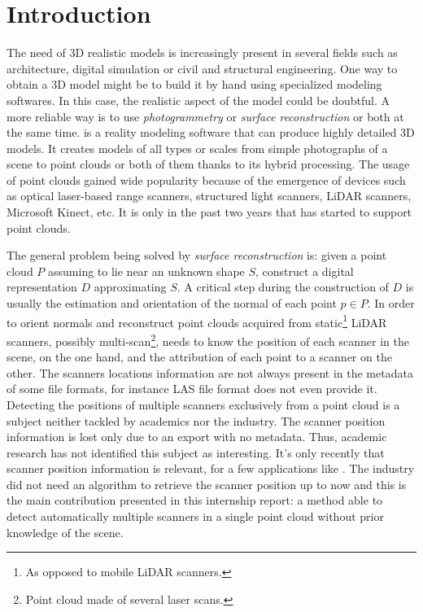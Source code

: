 \chapter{Introduction}
\label{ch:introduction}

The need of 3D realistic models is increasingly present in several fields such as architecture, digital simulation or civil and structural engineering. One way to obtain a 3D model might be to build it by hand using specialized modeling softwares. In this case, the realistic aspect of the model could be doubtful. A more reliable way is to use \emph{photogrammetry} or \emph{surface reconstruction} or both at the same time. \CC is a reality modeling software that can produce highly detailed 3D  models. It creates models of all types or scales from simple photographs of a scene to point clouds or both of them thanks to its hybrid processing. The usage of point clouds gained wide popularity because of the emergence of devices such as optical laser-based range scanners, structured light scanners, LiDAR scanners, Microsoft Kinect, etc. It is only in the past two years that \CC has started to support point clouds.

The general problem being solved by \emph{surface reconstruction} is:  given a point cloud $P$ assuming to lie near an unknown shape $S$,  construct a digital representation $D$ approximating $S$. A critical step during the construction of $D$ is usually the estimation and orientation of the normal of each point $p \in P$. In order to orient normals and  reconstruct point clouds acquired from static\footnote{As opposed to mobile LiDAR scanners.} LiDAR scanners, possibly multi-scan\footnote{Point cloud made of several laser scans.}, \CC needs to know the position of each scanner in the scene, on the one hand, and the attribution of each point to a scanner on the other. The scanners locations information are not always present in the metadata of some file formats, for instance LAS file format does not even provide it. Detecting the positions of multiple scanners exclusively from a point cloud is a subject neither tackled by academics nor the industry. The scanner position information is lost only due to an export with no metadata. Thus, academic research has not identified this subject as interesting. It’s only recently that scanner position information is relevant, for a few applications like \CC. The industry did not need an algorithm to retrieve the scanner position up to now and this is the main contribution presented in this internship report: a method able to detect automatically multiple scanners in a single point cloud without prior knowledge of the scene.

